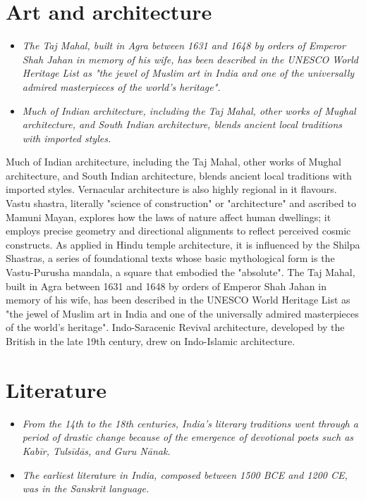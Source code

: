 \section{Art and architecture}\label{art-and-architecture}

\begin{itemize}
\item
  \emph{The Taj Mahal, built in Agra between 1631 and 1648 by orders of
  Emperor Shah Jahan in memory of his wife, has been described in the
  UNESCO World Heritage List as "the jewel of Muslim art in India and
  one of the universally admired masterpieces of the world's heritage".}
\item
  \emph{Much of Indian architecture, including the Taj Mahal, other
  works of Mughal architecture, and South Indian architecture, blends
  ancient local traditions with imported styles.}
\end{itemize}

Much of Indian architecture, including the Taj Mahal, other works of
Mughal architecture, and South Indian architecture, blends ancient local
traditions with imported styles. Vernacular architecture is also highly
regional in it flavours. Vastu shastra, literally "science of
construction" or "architecture" and ascribed to Mamuni Mayan, explores
how the laws of nature affect human dwellings; it employs precise
geometry and directional alignments to reflect perceived cosmic
constructs. As applied in Hindu temple architecture, it is influenced by
the Shilpa Shastras, a series of foundational texts whose basic
mythological form is the Vastu-Purusha mandala, a square that embodied
the "absolute". The Taj Mahal, built in Agra between 1631 and 1648 by
orders of Emperor Shah Jahan in memory of his wife, has been described
in the UNESCO World Heritage List as "the jewel of Muslim art in India
and one of the universally admired masterpieces of the world's
heritage". Indo-Saracenic Revival architecture, developed by the British
in the late 19th century, drew on Indo-Islamic architecture.

\section{Literature}\label{literature}

\begin{itemize}
\item
  \emph{From the 14th to the 18th centuries, India's literary traditions
  went through a period of drastic change because of the emergence of
  devotional poets such as Kabīr, Tulsīdās, and Guru Nānak.}
\item
  \emph{The earliest literature in India, composed between 1500 BCE and
  1200 CE, was in the Sanskrit language.}
\end{itemize}

